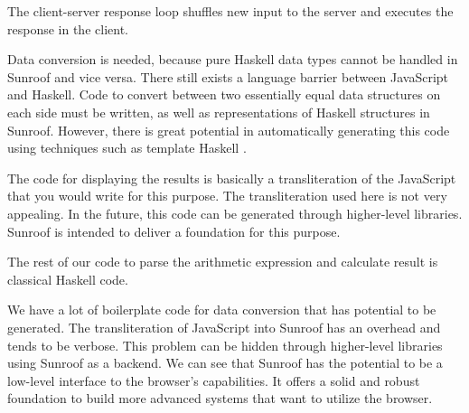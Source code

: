 The client-server response loop shuffles new input to the server 
and executes the response in the client.

Data conversion is needed, because pure Haskell data types
cannot be handled in Sunroof and vice versa. There still
exists a language barrier between JavaScript and Haskell. 
Code to convert between two essentially equal data structures on 
each side must be written, as well as representations of Haskell 
structures in Sunroof. However, there is great potential in automatically 
generating this code using techniques such as template Haskell
\cite{Sheard:02:TemplateMetaProgrammingHaskell}.

The code for displaying the results is basically a 
transliteration of the JavaScript that you would write for this 
purpose.
The transliteration used here is not very appealing. 
In the future, this code can be generated through higher-level 
libraries. Sunroof is intended to deliver a foundation for
this purpose.

The rest of our code to parse the arithmetic expression and calculate 
result is classical Haskell code. 

We have a lot of boilerplate code for data conversion
that has potential to be generated.
The transliteration of JavaScript into Sunroof has an overhead and
tends to be verbose. This problem can be hidden through 
higher-level libraries using Sunroof as a backend. 
We can see that Sunroof has the potential to be a low-level interface
to the browser's capabilities. It offers a solid and robust foundation to build
more advanced systems that want to utilize the browser.

